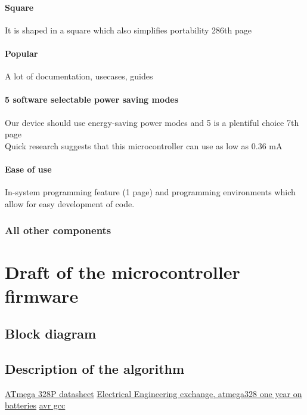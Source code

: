 \documentclass{article}
\begin{document}
\paragraph{Square} It is shaped in a square which also simplifies portability
\cite{datasheet} 286th page
\paragraph{Popular} A lot of documentation, usecases, guides
\paragraph{5 software selectable power saving modes} Our device should use
energy-saving power modes and 5 is a plentiful choice \cite{datasheet} 7th
page
\\
Quick research suggests that this microcontroller can use as low as 0.36 mA
\cite{powerSavingModes}
\paragraph{Ease of use} In-system programming feature \cite{datasheet} (1 page)
and programming environments which allow for easy development of code.
\cite{avrgcc} 
\subsubsection{All other components}
\section{Draft of the microcontroller firmware}
\subsection{Block diagram}
\subsection{Description of the algorithm}
\begin{thebibliography}{9}
	 \href{https://ww1.microchip.com/downloads/en/DeviceDoc/Atmel-7810-Automotive-Microcontrollers-ATmega328P_Datasheet.pdf}{ATmega
	328P datasheet}
	 \href{https://electronics.stackexchange.com/questions/49182/how-can-i-get-my-atmega328-to-run-for-a-year-on-batteries}{Electrical Engineering exchange,
	atmega328 one year on batteries}
	 \href{https://gcc.gnu.org/wiki/avr-gcc}{avr gcc}
\end{thebibliography}
\end{document}
